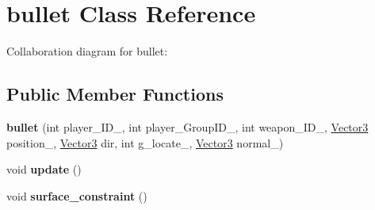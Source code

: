 \hypertarget{classbullet}{\section{bullet Class Reference}
\label{classbullet}
}


Collaboration diagram for bullet\+:
\subsection*{Public Member Functions}
\begin{DoxyCompactItemize}
\item 
\hypertarget{classbullet_a8dec0eadf1350da68b2193c5f33997e4}{{\bfseries bullet} (int player\+\_\+\+I\+D\+\_\+, int player\+\_\+\+Group\+I\+D\+\_\+, int weapon\+\_\+\+I\+D\+\_\+, \hyperlink{class_vector3}{Vector3} position\+\_\+, \hyperlink{class_vector3}{Vector3} dir, int g\+\_\+locate\+\_\+, \hyperlink{class_vector3}{Vector3} normal\+\_\+)}\label{classbullet_a8dec0eadf1350da68b2193c5f33997e4}

\item 
\hypertarget{classbullet_ad79bf3443b50c91f799ca978e9320fb9}{void {\bfseries update} ()}\label{classbullet_ad79bf3443b50c91f799ca978e9320fb9}

\item 
\hypertarget{classbullet_a9a4c110c177c0d73ff7e1784b8b6a32d}{void {\bfseries surface\+\_\+constraint} ()}\label{classbullet_a9a4c110c177c0d73ff7e1784b8b6a32d}

\end{DoxyCompactItemize}

